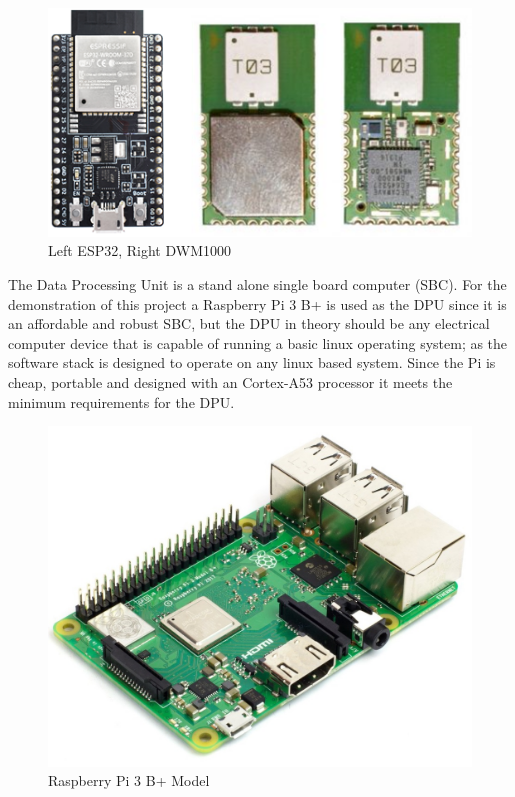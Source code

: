 \medskip
\begin{figure}[H]
\centering
    \includegraphics[scale=0.75]{./images/dwm_esp.png}
    \caption{Left ESP32, Right DWM1000}
    \label{dwm_esp}
\end{figure}

The Data Processing Unit is a stand alone single board computer (SBC). For the demonstration of this project a Raspberry Pi 3 B+ is used as the DPU since it is an affordable and robust SBC, but the DPU in theory should be any electrical computer device that is capable of running a basic linux operating system; as the software stack is designed to operate on any linux based system. Since the Pi is cheap, portable and designed with an Cortex-A53 processor it meets the minimum requirements for the DPU.

\medskip
\begin{figure}[H]
\centering
    \includegraphics[scale=1]{./images/pi.jpg}
    \caption{Raspberry Pi 3 B+ Model}
    \label{pi}
\end{figure}



